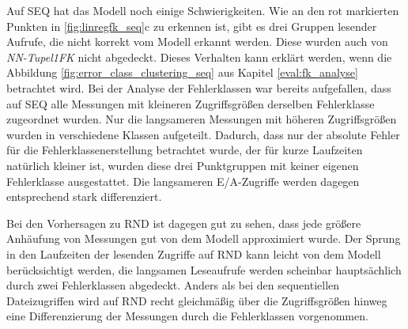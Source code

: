\documentclass[
	twoside,
	12pt,
	a4paper,
	BCOR10mm,
	DIV14,
	listof=totoc,
	bibliography=totoc,
	headsepline
]{scrreprt}
\begin{document}
Auf SEQ hat das Modell noch einige Schwierigkeiten. Wie an den rot markierten Punkten in \ref{fig:linregfk_seq}c zu erkennen ist, gibt es drei Gruppen lesender Aufrufe, die nicht korrekt vom Modell erkannt werden. Diese wurden auch von \textit{NN-Tupel1FK} nicht abgedeckt.
Dieses Verhalten kann erklärt werden, wenn die Abbildung \ref{fig:error_class_clustering_seq} aus Kapitel \ref{eval:fk_analyse} betrachtet wird.
Bei der Analyse der Fehlerklassen war bereits aufgefallen, dass auf SEQ alle Messungen mit kleineren Zugriffsgrößen derselben Fehlerklasse zugeordnet wurden.
Nur die langsameren Messungen mit höheren Zugriffsgrößen wurden in verschiedene Klassen aufgeteilt.
Dadurch, dass nur der absolute Fehler für die Fehlerklassenerstellung betrachtet wurde, der für kurze Laufzeiten natürlich kleiner ist, wurden diese drei Punktgruppen mit keiner eigenen Fehlerklasse ausgestattet.
Die langsameren E/A-Zugriffe werden dagegen entsprechend stark differenziert.\medskip

Bei den Vorhersagen zu RND ist dagegen gut zu sehen, dass jede größere Anhäufung von Messungen gut von dem Modell approximiert wurde.
Der Sprung in den Laufzeiten der lesenden Zugriffe auf RND kann leicht von dem Modell berücksichtigt werden, die langsamen Leseaufrufe werden scheinbar hauptsächlich durch zwei Fehlerklassen abgedeckt.
Anders als bei den sequentiellen Dateizugriffen wird auf RND recht gleichmäßig über die Zugriffsgrößen hinweg eine Differenzierung der Messungen durch die Fehlerklassen vorgenommen.\medskip
\end{document}
